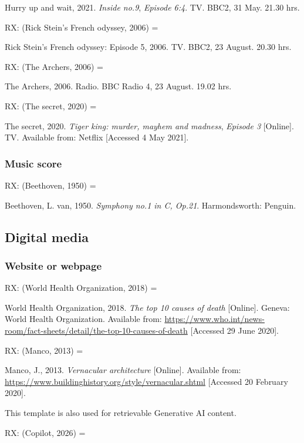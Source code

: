 Hurry up and wait, 2021. \emph{Inside no.9}, \emph{Episode 6:4}. TV. BBC2, 31 May. 21.30 hrs.


RX: (Rick Stein’s French odyssey, 2006) = \cite{rsfo2006ep5}

Rick Stein's French odyssey: Episode 5, 2006. TV. BBC2, 23 August. 20.30 hrs.


RX: (The Archers, 2006) = \cite{archers20060823}

The Archers, 2006. Radio. BBC Radio 4, 23 August. 19.02 hrs.


RX: (The secret, 2020) = \cite{tkmmm2020ts}

The secret, 2020. \emph{Tiger king: murder, mayhem and madness}, \emph{Episode 3} [Online]. TV. Available from: Netflix [Accessed 4 May 2021].



\subsubsection*{Music score}

RX: (Beethoven, 1950) = \cite{beethoven1950symph1}

Beethoven, L. van, 1950. \emph{Symphony no.1 in C, Op.21}. Harmondsworth: Penguin.



\subsection{Digital media}

\subsubsection*{Website or webpage}

RX: (World Health Organization, 2018) = \cite{who2018ttc}

World Health Organization, 2018. \emph{The top 10 causes of death} [Online]. Geneva: World Health Organization. Available from: \url{https://www.who.int/news-room/fact-sheets/detail/the-top-10-causes-of-death} [Accessed 29 June 2020].


RX: (Manco, 2013) = \cite{manco2013va}

Manco, J., 2013. \emph{Vernacular architecture} [Online]. Available from: \url{https://www.buildinghistory.org/style/vernacular.shtml} [Accessed 20 February 2020].


This template is also used for retrievable Generative AI content.

RX: (Copilot, 2026) = \cite{copilot2026wcr}

